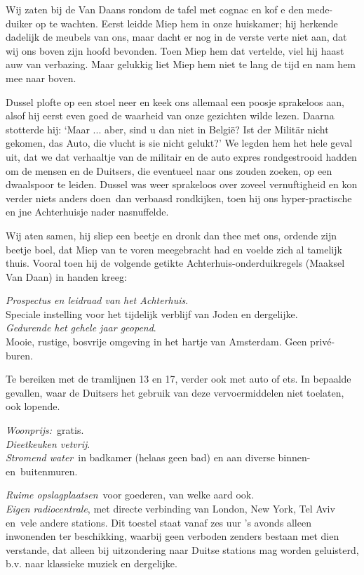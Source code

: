 \documentclass{book}
\begin{document}
Wij zaten bij de Van Daans rondom de tafel met cognac en kof e den
mede-duiker op te wachten. Eerst leidde Miep hem in onze huiskamer; hij
herkende dadelijk de meubels van ons, maar dacht er nog in de verste
verte niet aan, dat wij ons boven zijn hoofd bevonden. Toen Miep hem dat
vertelde, viel hij haast auw van verbazing. Maar gelukkig liet Miep hem
niet te lang de tijd en nam hem mee naar boven.

Dussel plofte op een stoel neer en keek ons allemaal een poosje
sprakeloos aan, alsof hij eerst even goed de waarheid van onze gezichten
wilde lezen. Daarna stotterde hij: `Maar ... aber, sind u dan niet in
België? Ist der Militär nicht gekomen, das Auto, die vlucht is sie nicht
gelukt?' We legden hem het hele geval uit, dat we dat verhaaltje van de
militair en de auto expres rondgestrooid hadden om de mensen en de
Duitsers, die eventueel naar ons zouden zoeken, op een dwaalspoor te
leiden. Dussel was weer sprakeloos over zoveel vernuftigheid en kon
verder niets anders doen~dan verbaasd rondkijken, toen hij ons
hyper-practische en jne Achterhuisje nader nasnuffelde.

Wij aten samen, hij sliep een beetje en dronk dan thee met ons, ordende
zijn beetje boel, dat Miep van te voren meegebracht had en voelde zich
al tamelijk thuis. Vooral toen hij de volgende getikte
Achterhuis-onderduikregels (Maaksel Van Daan) in handen kreeg:

\emph{Prospectus en leidraad van het Achterhuis}.\\Speciale instelling
voor het tijdelijk verblijf van Joden en dergelijke.\\\emph{Gedurende
het gehele jaar geopend}.\\Mooie, rustige, bosvrije omgeving in het
hartje van Amsterdam. Geen privé-buren.

Te bereiken met de tramlijnen 13 en 17, verder ook met auto of ets. In
bepaalde gevallen, waar de Duitsers het gebruik van deze vervoermiddelen
niet toelaten, ook lopende.

\emph{Woonprijs:}~gratis.\\\emph{Dieetkeuken vetvrij}.\\\emph{Stromend
water}~in badkamer (helaas geen bad) en aan diverse binnen-
en~buitenmuren.

\emph{Ruime opslagplaatsen}~voor goederen, van welke aard
ook.\\\emph{Eigen radiocentrale}, met directe verbinding van London, New
York, Tel Aviv en~vele andere stations. Dit toestel staat vanaf zes uur
's avonds alleen inwonenden ter beschikking, waarbij geen verboden
zenders bestaan met dien verstande, dat alleen bij uitzondering naar
Duitse stations mag worden geluisterd, b.v. naar klassieke muziek en
dergelijke.
\end{document}
